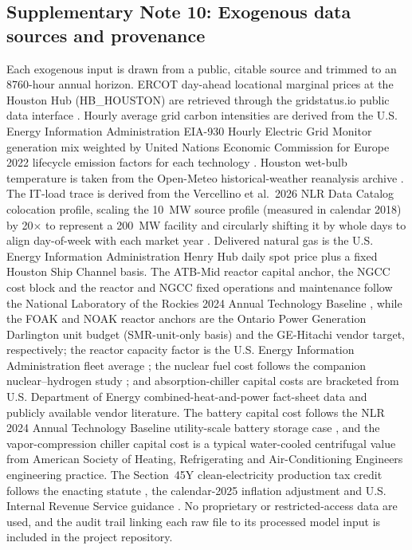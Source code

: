 \documentclass[sn-vancouver,Numbered]{sn-jnl}%
\begin{document}
\subsection*{Supplementary Note 10: Exogenous data sources and provenance}\label{note:provenance}
Each exogenous input is drawn from a public, citable source and trimmed to an 8760-hour annual horizon. ERCOT day-ahead locational marginal prices at the Houston Hub (HB\_HOUSTON) are retrieved through the gridstatus.io public data interface \citep{gridstatus}. Hourly average grid carbon intensities are derived from the U.S. Energy Information Administration EIA-930 Hourly Electric Grid Monitor generation mix \citep{eia930} weighted by United Nations Economic Commission for Europe 2022 lifecycle emission factors for each technology \citep{unece2022lca}. Houston wet-bulb temperature is taken from the Open-Meteo historical-weather reanalysis archive \citep{openmeteo2023}. The IT-load trace is derived from the Vercellino et al.\ 2026 NLR Data Catalog colocation profile, scaling the 10~MW source profile (measured in calendar 2018) by 20$\times$ to represent a 200~MW facility and circularly shifting it by whole days to align day-of-week with each market year \citep{vercellino2026aiworkload}. Delivered natural gas is the U.S. Energy Information Administration Henry Hub daily spot price \citep{eiaHenryHub} plus a fixed Houston Ship Channel basis. The ATB-Mid reactor capital anchor, the NGCC cost block and the reactor and NGCC fixed operations and maintenance follow the National Laboratory of the Rockies 2024 Annual Technology Baseline \citep{atb2024nuclear}, while the FOAK and NOAK reactor anchors are the Ontario Power Generation Darlington unit budget (SMR-unit-only basis) and the GE-Hitachi vendor target, respectively; the reactor capacity factor is the U.S. Energy Information Administration fleet average \citep{eia2025capacityfactors}; the nuclear fuel cost follows the companion nuclear--hydrogen study \citep{li2026nuclearH2}; and absorption-chiller capital costs are bracketed from U.S. Department of Energy combined-heat-and-power fact-sheet data \citep{doe2017chpAbsorption} and publicly available vendor literature. The battery capital cost follows the NLR 2024 Annual Technology Baseline utility-scale battery storage case \citep{atb2024nuclear}, and the vapor-compression chiller capital cost is a typical water-cooled centrifugal value from American Society of Heating, Refrigerating and Air-Conditioning Engineers engineering practice. The Section~45Y clean-electricity production tax credit follows the enacting statute \citep{usc26_45y,ira2022}, the calendar-2025 inflation adjustment \citep{fr2025_45y} and U.S. Internal Revenue Service guidance \citep{irs45y}. No proprietary or restricted-access data are used, and the audit trail linking each raw file to its processed model input is included in the project repository.
\end{document}

